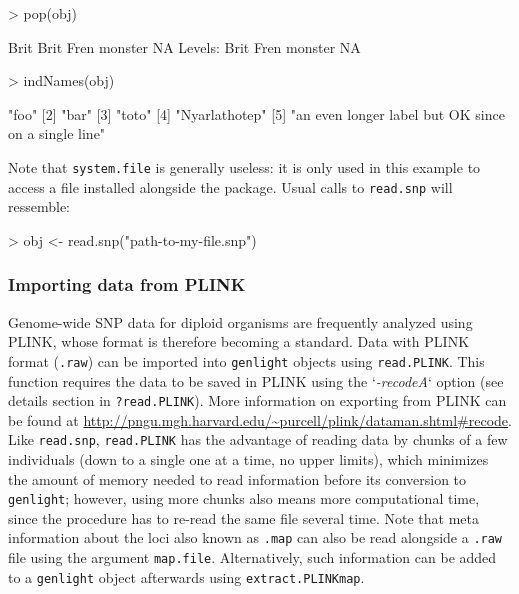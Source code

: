 \documentclass{article}
\begin{document}
\begin{Schunk}
\begin{Sinput}
> pop(obj)
\end{Sinput}
\begin{Soutput}
[1] Brit    Brit    Fren    monster NA     
Levels: Brit Fren monster NA
\end{Soutput}
\begin{Sinput}
> indNames(obj)
\end{Sinput}
\begin{Soutput}
[1] "foo"                                               
[2] "bar"                                               
[3] "toto"                                              
[4] "Nyarlathotep"                                      
[5] "an even longer label but OK since on a single line"
\end{Soutput}
\end{Schunk}
Note that \texttt{system.file} is generally useless: it is only used in this example to access a
file installed alongside the package. Usual calls to \texttt{read.snp} will ressemble:
\begin{Schunk}
\begin{Sinput}
> obj <- read.snp("path-to-my-file.snp")
\end{Sinput}
\end{Schunk}


\subsubsection{Importing data from PLINK}

Genome-wide SNP data for diploid organisms are frequently analyzed using PLINK, whose format is
therefore becoming a standard.
Data with PLINK format (\texttt{.raw}) can be imported into \texttt{genlight} objects using \texttt{read.PLINK}.
This function requires the data to be saved in PLINK using the `\textit{-recodeA}` option (see details
section in \texttt{?read.PLINK}).
More information on exporting from PLINK can be found at \url{http://pngu.mgh.harvard.edu/~purcell/plink/dataman.shtml#recode}.
\\


Like \texttt{read.snp}, \texttt{read.PLINK} has the advantage of reading data by chunks of a few individuals
(down to a single one at a time, no upper limits), which minimizes the amount of memory needed to read information
before its conversion to \texttt{genlight}; however, using more chunks also means more computational
time, since the procedure has to re-read the same file several time.
Note that meta information about the loci also known as \texttt{.map} can also be read alongside a
\texttt{.raw} file using the argument \texttt{map.file}.
Alternatively, such information can be added to a \texttt{genlight} object afterwards using \texttt{extract.PLINKmap}.
\end{document}
